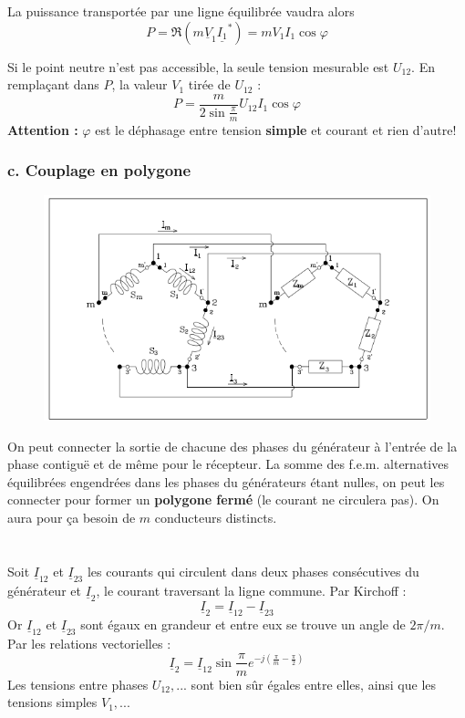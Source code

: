 La puissance transportée par une ligne équilibrée vaudra alors 
\begin{equation}
	P = \Re(m \underline{V}_1\underline{I_1}^*) = mV_1I_1\cos\varphi
\end{equation}
		
Si le point neutre n'est pas accessible, la seule tension mesurable 
est $U_{12}$. En remplaçant dans $P$, la valeur $V_1$ tirée de 
$U_{12}$ :
\begin{equation}
	P = \frac{m}{2\sin\frac{\pi}{m}}U_{12}I_1\cos\varphi
\end{equation}
\textbf{Attention :} $\varphi$ est le déphasage entre tension \textbf{simple }
et courant et rien d'autre!
		
		
\subsubsection{c. Couplage en polygone}
\begin{figure}
	\vspace{-5mm}
	\includegraphics[scale=0.4]{ch1/image8.png}
\end{figure}		
On peut connecter la sortie de chacune des phases du générateur à 
l'entrée de la phase contiguë et de même pour le récepteur. La somme 
des f.e.m. alternatives équilibrées engendrées dans les phases du 
générateurs étant nulles, on peut les connecter pour former un 
\textbf{polygone fermé} (le courant ne circulera pas). On aura pour ça
besoin de $m$ conducteurs distincts.\\
\ \\
\\

Soit $\underline{I}_{12}$ et $\underline{I}_{23}$ les courants qui 
circulent dans deux phases consécutives du générateur et $\underline{I}_
2$, le courant traversant la ligne commune. Par Kirchoff :
\begin{equation}
	\underline{I}_2 = \underline{I}_{12}-\underline{I}_{23}
\end{equation}
Or $\underline{I}_{12}$ et $\underline{I}_{23}$  sont égaux en 
grandeur et entre eux se trouve un angle de $2\pi/m$. Par les 
relations vectorielles :
\begin{equation}
	\underline{I}_2 = \underline{I}_{12}\sin\frac{\pi}{m}e^{-j\left(\frac{
		\pi}{m}-\frac{\pi}{2}\right)}
\end{equation} 
		Les tensions entre phases $U_{12}, ...$ sont bien sûr égales entre elles, ainsi que les tensions simples $V_1,... $
		
